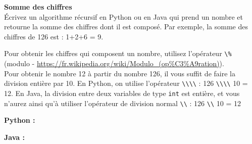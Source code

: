 \begin{Exercice}[5 minutes] \textbf{Somme des chiffres} \\
Écrivez un algorithme récursif en Python ou en Java qui prend un nombre et retourne la somme des chiffres dont il est composé. Par exemple, la somme des chiffres de 126 est : 1+2+6 = 9.

\begin{conseil}

Pour obtenir les chiffres qui composent un nombre, utilisez l'opérateur \lstinline{\%} (modulo - \url{https://fr.wikipedia.org/wiki/Modulo\_(op\%C3\%A9ration)}). \\
Pour obtenir le nombre 12 à partir du nombre 126, il vous suffit de faire la division entière par 10. En Python, on utilise l'opérateur \lstinline{\\\\} : 126 \lstinline{\\\\} 10 = 12. En Java, la division entre deux variables de type \lstinline{int} est entière, et vous n'aurez ainsi qu'à utiliser l'opérateur de division normal \lstinline{\\} : 126 \lstinline{\\} 10 = 12

\end{conseil}

\begin{solution}
\textbf{Python :}
    
            
\textbf{Java :}
   

\end{solution}
\end{Exercice}

